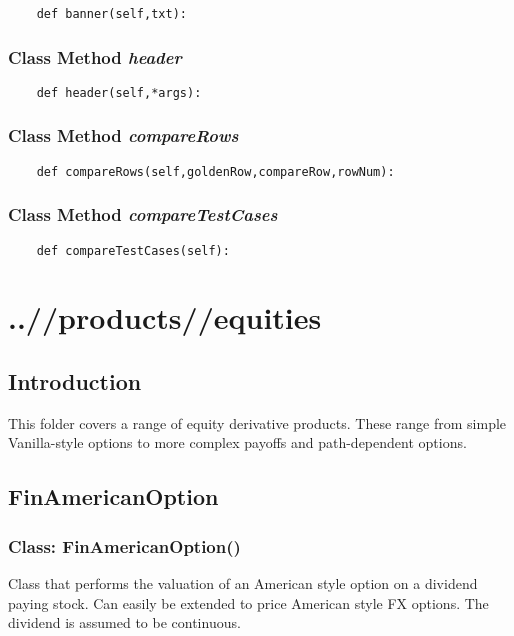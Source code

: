 \documentclass[twoside,11pt]{book}
\begin{document}
\begin{lstlisting}
    def banner(self,txt):
\end{lstlisting}

\subsection{Class Method {\it header}}


\begin{lstlisting}
    def header(self,*args):
\end{lstlisting}

\subsection{Class Method {\it compareRows}}


\begin{lstlisting}
    def compareRows(self,goldenRow,compareRow,rowNum):
\end{lstlisting}

\subsection{Class Method {\it compareTestCases}}


\begin{lstlisting}
    def compareTestCases(self):
\end{lstlisting}


\chapter{..//products//equities}
\section{Introduction}
This folder covers a range of equity derivative products. These range from simple Vanilla-style options to more complex payoffs and path-dependent options. 
\newpage
\section{FinAmericanOption}

\subsection{Class: FinAmericanOption()}
Class that performs the valuation of an American style option on a dividend paying stock. Can easily be extended to price American style FX options. The dividend is assumed to be continuous. 
\end{document}
